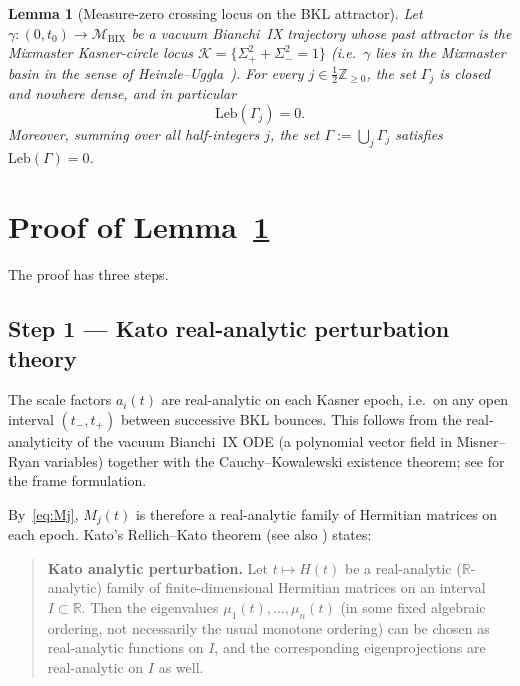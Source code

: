 \documentclass[11pt]{article}
\newtheorem{lemma}{Lemma}[section]
\theoremstyle{definition}
\newcommand{\R}{\mathbb{R}}
\newcommand{\Z}{\mathbb{Z}}
\newcommand{\BIX}{\mathrm{BIX}}
\newcommand{\KK}{\mathcal{K}}
\begin{document}
\begin{lemma}[Measure-zero crossing locus on the BKL attractor]\label{lem:A1}
  Let $\gamma : (0,t_0) \to \mathcal{M}_{\BIX}$ be a vacuum Bianchi~IX trajectory
  whose past attractor is the Mixmaster Kasner-circle locus
  $\KK = \{\Sigma_+^2+\Sigma_-^2=1\}$ (i.e.\ $\gamma$ lies in the Mixmaster basin
  in the sense of Heinzle--Uggla~\cite{HeinzleUggla2009}).
  For every $j \in \tfrac{1}{2}\Z_{\ge 0}$, the set $\Gamma_j$ is closed
  and nowhere dense, and in particular
  \[
    \mathrm{Leb}(\Gamma_j) = 0.
  \]
  Moreover, summing over all half-integers $j$, the set
  $\Gamma := \bigcup_j \Gamma_j$ satisfies $\mathrm{Leb}(\Gamma) = 0$.
\end{lemma}

\section{Proof of Lemma~\ref{lem:A1}}

The proof has three steps.

\subsection{Step 1 --- Kato real-analytic perturbation theory}

The scale factors $a_i(t)$ are real-analytic on each Kasner epoch, i.e.\ on any
open interval $(t_-,t_+)$ between successive BKL bounces.  This follows from the
real-analyticity of the vacuum Bianchi~IX ODE (a polynomial vector field in
Misner--Ryan variables) together with the Cauchy--Kowalewski existence theorem;
see \cite[Ch.~I]{WainwrightEllis1997} for the frame formulation.

By~\eqref{eq:Mj}, $M_j(t)$ is therefore a real-analytic family of Hermitian
matrices on each epoch.  Kato's Rellich--Kato theorem
\cite[\S XII.2, Thm.~XII.3]{ReedSimon4} (see also \cite[Ch.~II, \S 6]{Kato1966})
states:

\begin{quote}
  \textbf{Kato analytic perturbation.}
  Let $t \mapsto H(t)$ be a real-analytic ($\R$-analytic) family of finite-dimensional
  Hermitian matrices on an interval $I \subset \R$.  Then the eigenvalues
  $\mu_1(t),\ldots,\mu_n(t)$ (in some fixed algebraic ordering, not necessarily the
  usual monotone ordering) can be chosen as real-analytic functions on $I$, and
  the corresponding eigenprojections are real-analytic on $I$ as well.
\end{quote}
\end{document}
